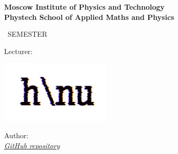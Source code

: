 \begin{titlepage}
	\clearpage\thispagestyle{empty}
	\centering
	
	\textbf{Moscow Institute of Physics and Technology \\ Phystech School of Applied Maths and Physics}
	\vspace{33ex}
	
	{\textbf{\FullCourseNameFirstPart}}
	
	\SemesterNumber\ SEMESTER
	\vspace{1ex}
	
	Lecturer: \textit{\LecturerInitials}
	
	\ifdefined\nologo\else
		\includegraphics[width=0.4\textwidth]{images/logo_ltc.png}
	\fi

	\begin{flushright}
		\noindent
		Author: \href{\VKLink}{\textit{\AuthorInitials}}
		\\
		\href{\GithubLink}{\textit{GitHub repository}}
	\end{flushright}
	
	\vfill
	\CourseDate
	\pagebreak
\end{titlepage}
